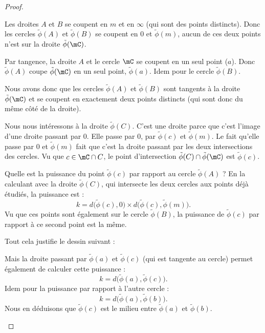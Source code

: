 \begin{proof}
\begin{subproof}
		Les droites \( A\) et \( B\) se coupent en \( m\) et en \( \infty\) (qui sont des points distincts). Donc les cercles \( \tilde \phi(A)\) et \( \tilde \phi(B)\) se coupent en \( 0\) et \( \tilde \phi(m)\), aucun de ces deux points n'est sur la droite \( \tilde \phi(\mC)\).

		Par tangence, la droite \( A\) et le cercle \( \mC\) se coupent en un seul point (\( a\)). Donc \( \tilde \phi(A)\) coupe \( \tilde \phi(\mC)\) en un seul point, \( \tilde \phi(a)\). Idem pour le cercle \( \tilde \phi(B)\).

		Nous avons donc que les cercles \( \tilde \phi(A)\) et \( \tilde \phi(B)\) sont tangents à la droite \( \tilde \phi(\mC)\) et se coupent en exactement deux points distincts (qui sont donc du même côté de la droite).

		Nous nous intéressons à la droite \( \tilde \phi(C)\). C'est une droite parce que c'est l'image d'une droite passant par \( 0\). Elle passe par \( 0\), par \( \tilde \phi(c)\) et \( \tilde \phi(m)\). Le fait qu'elle passe par \( 0\) et \( \tilde \phi(m)\) fait que c'est la droite passant par les deux intersections des cercles. Vu que \( c\in \mC\cap C\), le point d'intersection \( \tilde \phi(C)\cap \tilde \phi(\mC)\) est \( \tilde \phi(c)\).

		Quelle est la puissance du point \( \tilde \phi(c)\) par rapport au cercle \( \tilde \phi(A)\) ? En la calculant avec la droite \( \tilde \phi(C)\), qui intersecte les deux cercles aux points déjà étudiés, la puissance est :
		\begin{equation}
			k=d\big( \tilde \phi(c),0 \big)\times d\big( \tilde \phi(c),\tilde \phi(m) \big).
		\end{equation}
		Vu que ces points sont également sur le cercle \( \tilde \phi(B)\), la puissance de \( \tilde \phi(c)\) par rapport à ce second point est la même.

		Tout cela justifie le dessin suivant :

		\begin{center}
			
		\end{center}

		Mais la droite passant par \( \tilde \phi(a)\) et \( \tilde \phi(c)\) (qui est tangente au cercle) permet également de calculer cette puissance :
		\begin{equation}
			k=d\big( \tilde \phi(a),\tilde \phi(c) \big).
		\end{equation}
		Idem pour la puissance par rapport à l'autre cercle :
		\begin{equation}
			k=d\big( \tilde \phi(a),\tilde \phi(b) \big).
		\end{equation}
		Nous en déduisons que \( \tilde \phi(c)\) est le milieu entre \( \tilde \phi(a)\) et \( \tilde \phi(b)\).


\end{subproof}
\end{proof}
